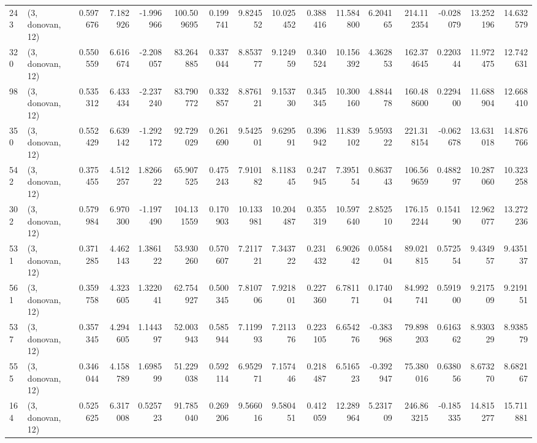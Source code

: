 \begin{tabular}{llrrrrrrrrrrrrrr}
243 &  (3, donovan, 12) &   0.597676 &   7.182926 &  -1.996966 &   100.509695 &   0.199741 &   9.824552 &  10.025452 &  0.388416 &  11.584800 &   6.204165 &   214.112354 & -0.028079 &  13.252196 &  14.632579 \\
320 &  (3, donovan, 12) &   0.550559 &   6.616674 &  -2.208057 &    83.264885 &   0.337044 &   8.853777 &   9.124959 &  0.340524 &  10.156392 &   4.362853 &   162.374645 &  0.220344 &  11.972475 &  12.742631 \\
98  &  (3, donovan, 12) &   0.535312 &   6.433434 &  -2.237240 &    83.790772 &   0.332857 &   8.876121 &   9.153730 &  0.345345 &  10.300160 &   4.884478 &   160.488600 &  0.229400 &  11.688904 &  12.668410 \\
350 &  (3, donovan, 12) &   0.552429 &   6.639142 &  -1.292172 &    92.729029 &   0.261690 &   9.542501 &   9.629591 &  0.396942 &  11.839102 &   5.959322 &   221.318154 & -0.062678 &  13.631018 &  14.876766 \\
542 &  (3, donovan, 12) &   0.375455 &   4.512257 &   1.826622 &    65.907525 &   0.475243 &   7.910182 &   8.118345 &  0.247945 &   7.395154 &   0.863743 &   106.569659 &  0.488297 &  10.287060 &  10.323258 \\
302 &  (3, donovan, 12) &   0.579984 &   6.970300 &  -1.197490 &   104.131559 &   0.170903 &  10.133981 &  10.204487 &  0.355319 &  10.597640 &   2.852510 &   176.152244 &  0.154190 &  12.962077 &  13.272236 \\
531 &  (3, donovan, 12) &   0.371285 &   4.462143 &   1.386122 &    53.930260 &   0.570607 &   7.211721 &   7.343722 &  0.231432 &   6.902642 &   0.058404 &    89.021815 &  0.572554 &   9.434957 &   9.435137 \\
561 &  (3, donovan, 12) &   0.359758 &   4.323605 &   1.322041 &    62.754927 &   0.500345 &   7.810706 &   7.921801 &  0.227360 &   6.781171 &   0.174004 &    84.992741 &  0.591900 &   9.217509 &   9.219151 \\
537 &  (3, donovan, 12) &   0.357345 &   4.294605 &   1.144397 &    52.003943 &   0.585944 &   7.119993 &   7.211376 &  0.223105 &   6.654276 &  -0.383968 &    79.898203 &  0.616362 &   8.930329 &   8.938579 \\
555 &  (3, donovan, 12) &   0.346044 &   4.158789 &   1.698599 &    51.229038 &   0.592114 &   6.952971 &   7.157446 &  0.218487 &   6.516523 &  -0.392947 &    75.380016 &  0.638056 &   8.673270 &   8.682167 \\
164 &  (3, donovan, 12) &   0.525625 &   6.317008 &   0.525723 &    91.785040 &   0.269206 &   9.566016 &   9.580451 &  0.412059 &  12.289964 &   5.231709 &   246.863215 & -0.185335 &  14.815277 &  15.711881 \\

\end{tabular}
